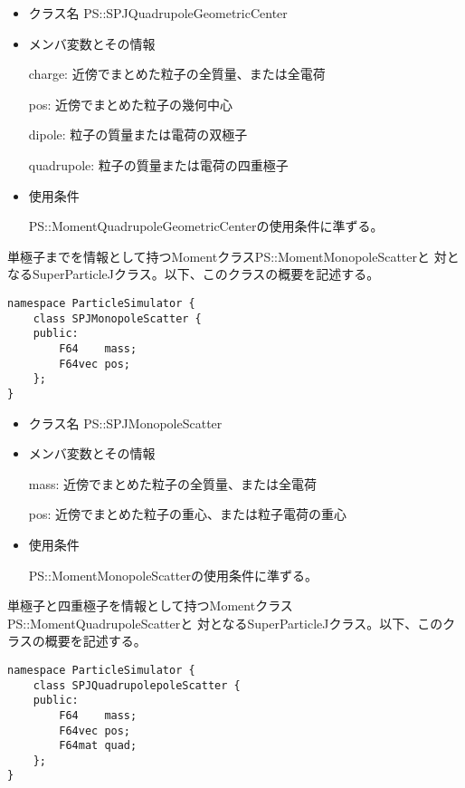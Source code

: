 \begin{itemize}
\item クラス名
  PS::SPJQuadrupoleGeometricCenter

\item メンバ変数とその情報

  charge: 近傍でまとめた粒子の全質量、または全電荷

  pos: 近傍でまとめた粒子の幾何中心

  dipole: 粒子の質量または電荷の双極子

  quadrupole: 粒子の質量または電荷の四重極子

\item 使用条件

  PS::MomentQuadrupoleGeometricCenterの使用条件に準ずる。

\end{itemize}
  

\label{sec:SPJMonopoleScatter}

単極子までを情報として持つMomentクラスPS::MomentMonopoleScatterと
対となるSuperParticleJクラス。以下、このクラスの概要を記述する。
\begin{screen}
\begin{verbatim}
namespace ParticleSimulator {
    class SPJMonopoleScatter {
    public:
        F64    mass;
        F64vec pos;
    };
}
\end{verbatim}
\end{screen}

\begin{itemize}
\item クラス名
  PS::SPJMonopoleScatter

\item メンバ変数とその情報

  mass: 近傍でまとめた粒子の全質量、または全電荷

  pos: 近傍でまとめた粒子の重心、または粒子電荷の重心

\item 使用条件

  PS::MomentMonopoleScatterの使用条件に準ずる。

\end{itemize}

\label{sec:SPJQuadrupoleScatter}

単極子と四重極子を情報として持つMomentクラスPS::MomentQuadrupoleScatterと
対となるSuperParticleJクラス。以下、このクラスの概要を記述する。
\begin{screen}
\begin{verbatim}
namespace ParticleSimulator {
    class SPJQuadrupolepoleScatter {
    public:
        F64    mass;
        F64vec pos;
        F64mat quad;
    };
}
\end{verbatim}
\end{screen}

